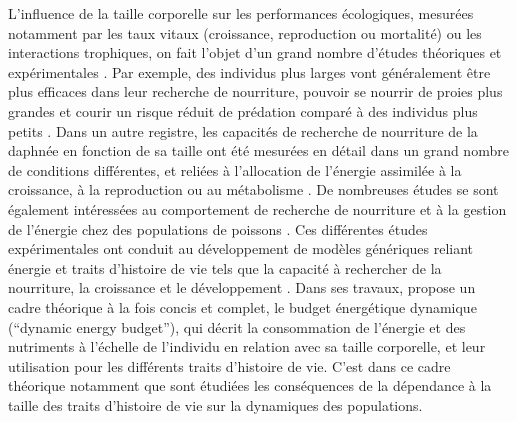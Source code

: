 L'influence de la taille corporelle sur les performances écologiques, mesurées
notamment par les taux vitaux (croissance, reproduction ou mortalité) ou les
interactions trophiques, on fait l'objet d'un grand nombre d'études théoriques
et expérimentales
\autocites[][\ldots]{peters1986a,calder1996a,de-roos2001a,claessen2004a}. Par
exemple, des individus plus larges vont généralement être plus efficaces dans
leur recherche de nourriture, pouvoir se nourrir de proies plus grandes et
courir un risque réduit de prédation comparé à des individus plus petits
\autocites{paradis1996a}.
Dans un autre registre, les capacités de recherche de nourriture de la daphnée
en fonction de sa taille ont été mesurées en détail dans un grand nombre de
conditions différentes, et reliées à l'allocation de l'énergie assimilée à la
croissance, à la reproduction ou au métabolisme \autocites[par ex.
][]{lampert1978a,gurney1990a,mccauley1990a,kooijman2000a}. De nombreuses études
se sont également intéressées au comportement de recherche de nourriture et à la
gestion de l'énergie chez des populations de poissons \autocites[par ex.
][]{elliott1975a,mittelbach1981a,fuiman1994a,hjelm2001a}. Ces différentes études
expérimentales ont conduit au développement de modèles génériques reliant
énergie et traits d'histoire de vie tels que la capacité à rechercher de la
nourriture, la croissance et le développement
\autocites{kooijman2000a, nisbet2000a, west2001a}. Dans ses travaux,
\textcite{kooijman2000a} propose un cadre théorique à la fois concis et complet,
le budget énergétique dynamique (``dynamic energy budget''), qui décrit la
consommation  de l'énergie et des nutriments à l'échelle de l'individu en
relation avec sa taille corporelle, et leur utilisation pour les différents
traits d'histoire de vie. C'est dans ce cadre théorique notamment que sont
étudiées les conséquences de la dépendance à la taille des traits d'histoire de
vie sur la dynamiques des populations.

